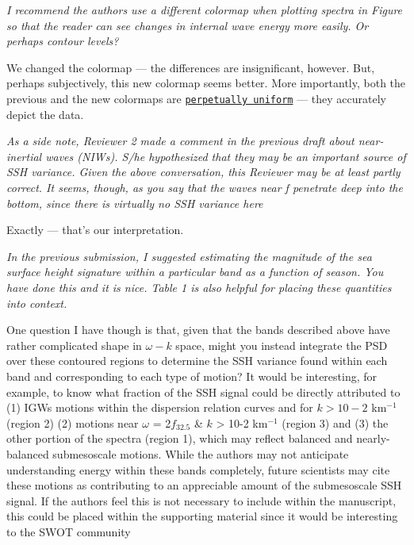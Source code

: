 \documentclass[11pt]{article}
\newcommand{\bdp}{\begin{description}}
\newcommand{\edp}{\end{description}}
\begin{document}
\begin{enumerate}
\item {\it I recommend the authors use a different colormap when plotting spectra in Figure so that the
reader can see changes in internal wave energy more easily. Or perhaps contour levels?}

\bdp
  \item \noindent We changed the colormap --- the differences are insignificant, however.
        But, perhaps subjectively, this new colormap seems better. More importantly,
        both the previous and the new colormaps are \href{https://en.wikipedia.org/wiki/Color_difference#Tolerance}{\tt perpetually uniform}
        --- they accurately depict the data.
\edp

\item {\it As a side note, Reviewer 2 made a comment in the previous draft about near-inertial waves
(NIWs). S/he hypothesized that they may be an important source of SSH variance. Given the
above conversation, this Reviewer may be at least partly correct. It seems, though, as you say
that the waves near f penetrate deep into the bottom, since there is virtually no SSH variance
here}

\bdp
  \item \noindent Exactly --- that's our interpretation.
\edp

\item{\it In the previous submission, I suggested estimating the magnitude of the sea surface height
signature within a particular band as a function of season. You have done this and it is nice.
Table 1 is also helpful for placing these quantities into context.

One question I have though is that, given that the bands described above have rather
complicated shape in $\omega-k$ space, might you instead integrate the PSD over these contoured
regions to determine the SSH variance found within each band and corresponding to each
type of motion? It would be interesting, for example, to know what fraction of the SSH signal
could be directly attributed to (1) IGWs motions within the dispersion relation curves and for
$k > 10-2$ km$^{-1}$ (region 2) (2) motions near $\omega$ = 2$f_{32.5}$ \& $k$ > 10-2 km$^{-1}$ (region 3) and (3) the
other portion of the spectra (region 1), which may reflect balanced and nearly-balanced
submesoscale motions. While the authors may not anticipate understanding energy within
these bands completely, future scientists may cite these motions as contributing to an
appreciable amount of the submesoscale SSH signal. If the authors feel this is not necessary
to include within the manuscript, this could be placed within the supporting material since it
would be interesting to the SWOT community}


\end{enumerate}
\end{document}
